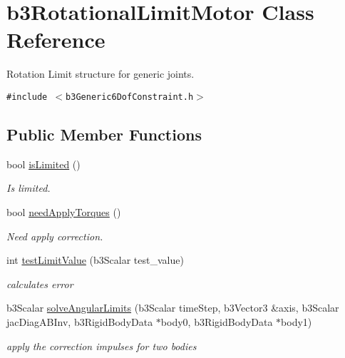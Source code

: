 \hypertarget{classb3_rotational_limit_motor}{
\section{b3RotationalLimitMotor Class Reference}
\label{classb3_rotational_limit_motor}
}
Rotation Limit structure for generic joints.  


{\tt \#include $<$b3Generic6DofConstraint.h$>$}

\subsection*{Public Member Functions}
\begin{CompactItemize}
\item 
\hypertarget{classb3_rotational_limit_motor_f749ea80f651c820a2c18ef7c291f530}{
bool \hyperlink{classb3_rotational_limit_motor_f749ea80f651c820a2c18ef7c291f530}{isLimited} ()}
\label{classb3_rotational_limit_motor_f749ea80f651c820a2c18ef7c291f530}

\begin{CompactList}\small\item\em Is limited. \item\end{CompactList}\item 
\hypertarget{classb3_rotational_limit_motor_0709b6ffa80e04e1091174554f39cdcf}{
bool \hyperlink{classb3_rotational_limit_motor_0709b6ffa80e04e1091174554f39cdcf}{needApplyTorques} ()}
\label{classb3_rotational_limit_motor_0709b6ffa80e04e1091174554f39cdcf}

\begin{CompactList}\small\item\em Need apply correction. \item\end{CompactList}\item 
int \hyperlink{classb3_rotational_limit_motor_27246819c09d6029fb7f7c2f506ac9fd}{testLimitValue} (b3Scalar test\_\-value)
\begin{CompactList}\small\item\em calculates error \item\end{CompactList}\item 
\hypertarget{classb3_rotational_limit_motor_665bed66ad8411e198d005382cead2db}{
b3Scalar \hyperlink{classb3_rotational_limit_motor_665bed66ad8411e198d005382cead2db}{solveAngularLimits} (b3Scalar timeStep, b3Vector3 \&axis, b3Scalar jacDiagABInv, b3RigidBodyData $\ast$body0, b3RigidBodyData $\ast$body1)}
\label{classb3_rotational_limit_motor_665bed66ad8411e198d005382cead2db}

\begin{CompactList}\small\item\em apply the correction impulses for two bodies \item\end{CompactList}\end{CompactItemize}
